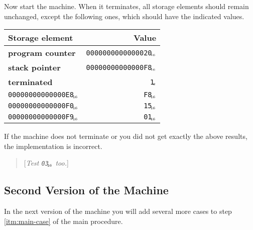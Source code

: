 \documentclass[a4paper,12pt]{article}
\newcommand{\num}[1]{\texttt{#1}\xspace}
\newcommand{\hex}[1]{\num{#1}$_{\textup{\tiny\hskip-1ex 16}}$\xspace}
\newcommand{\bin}[1]{\num{#1}$_{\textup{\tiny\hskip-1ex 2}}$\xspace}
\newcommand{\PC}{\textbf{program counter}\xspace}
\newcommand{\SP}{\textbf{stack pointer}\xspace}
\newcommand{\TERM}{\textbf{terminated}\xspace}
\newcommand{\T}{\bin{1}}
\newcommand{\comment}[1]{\begin{quote}[\textit{#1}]\end{quote}}
\newcommand{\op}[1]{#1}
\newcommand{\JUMPZERO}  [1]{\op{\hex{03}}}
\begin{document}
Now start the machine.
When it terminates, all storage elements should remain unchanged, except the following ones, which should have the indicated values.

\begin{center}
  \begin{tabular}{@{}lr@{}}
    \hline
    Storage element        & Value                   \\
    \hline
    \PC                    & \hex{0000000000000020}  \\
    \SP                    & \hex{00000000000000F8}  \\
    \TERM                  & \T                      \\
    \hex{00000000000000E8} & \hex{F8} \\
    \hex{00000000000000F0} & \hex{15} \\
    \hex{00000000000000F9} & \hex{01} \\
    \hline
  \end{tabular}
\end{center}

If the machine does not terminate or you did not get exactly the above results, the implementation is incorrect.

\comment{Test \JUMPZERO{} too.}

\subsection{Second Version of the Machine}

In the next version of the machine you will add several more cases to step \ref{itm:main-case} of the main procedure.
\end{document}
